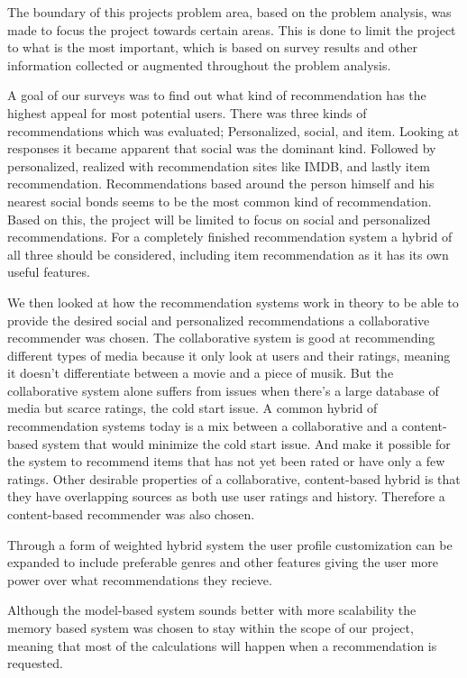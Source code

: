 The boundary of this projects problem area, based on the problem analysis, was made to focus the project towards certain areas. This is done to limit the project to what is the most important, which is based on survey results and other information collected or augmented throughout the problem analysis.

A goal of our surveys was to find out what kind of recommendation has the highest appeal for most potential users. There was three kinds of recommendations which was evaluated; Personalized, social, and item. Looking at responses it became apparent that social was the dominant kind. Followed by personalized, realized with recommendation sites like IMDB, and lastly item recommendation. Recommendations based around the person himself and his nearest social bonds seems to be the most common kind of recommendation. Based on this, the project will be limited to focus on social and personalized recommendations. For a completely finished recommendation system a hybrid of all three should be considered, including item recommendation as it has its own useful features.

We then looked at how the recommendation systems work in theory to be able to provide the desired social and personalized recommendations a collaborative recommender was chosen. The collaborative system is good at recommending different types of media because it only look at users and their ratings, meaning it doesn't differentiate between a movie and a piece of musik.  But the collaborative system alone suffers from issues when there's a large database of media but scarce ratings, the cold start issue. A common hybrid of recommendation systems today is a mix between a collaborative and a content-based system that would minimize the cold start issue. And make it possible for the system to recommend items that has not yet been rated or have only a few ratings. Other desirable properties of a collaborative, content-based hybrid is that they have overlapping sources as both use user ratings and history. Therefore a content-based recommender was also chosen. 

Through a form of weighted hybrid system the user profile customization can be expanded to include preferable genres and other features giving the user more power over what recommendations they recieve. 

Although the model-based system sounds better with more scalability the memory based system was chosen to stay within the scope of our project, meaning that most of the calculations will happen when a recommendation is requested.

